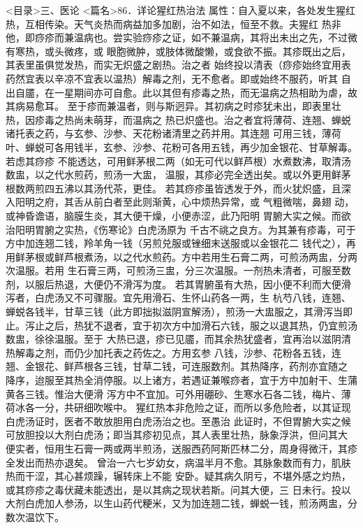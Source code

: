 \documentclass[a4paper,12pt,UTF8,twoside]{ctexbook}
\begin{document}
<目录>三、医论
<篇名>86．详论猩红热治法
属性：自入夏以来，各处发生猩红热，互相传染。天气炎热而病益加多加剧，治不如法，恒至不救。夫猩红 
热非他，即痧疹而兼温病也。尝实验痧疹之证，如不兼温病，其将出未出之先，不过微有寒热，或头微疼，或 
眼胞微肿，或肢体微酸懒，或食欲不振。其疹既出之后，其表里虽俱觉发热，而实无炽盛之剧热。治之者 
始终投以清表（痧疹始终宜用表药然宜表以辛凉不宜表以温热）解毒之剂，无不愈者。即或始终不服药，听其 
自出自靥，在一星期间亦可自愈。此以其但有疹毒之热，而无温病之热相助为虐，故其病易愈耳。 
至于疹而兼温者，则与斯迥异。其初病之时疹犹未出，即表里壮热，因疹毒之热尚未萌芽，而温病之 
热已炽盛也。治之者宜将薄荷、连翘、蝉蜕诸托表之药，与玄参、沙参、天花粉诸清里之药并用。其连翘 
可用三钱，薄荷叶、蝉蜕可各用钱半，玄参、沙参、花粉可各用五钱，再少加金银花、甘草解毒。若虑其痧疹 
不能透达，可用鲜茅根二两（如无可代以鲜芦根）水煮数沸，取清汤数盅，以之代水煎药，煎汤一大盅， 
温服，其疹必完全透出矣。或以外更用鲜茅根数两煎四五沸以其汤代茶，更佳。 
若其痧疹虽皆透发于外，而火犹炽盛，且深入阳明之府，其舌从前白者至此则渐黄，心中烦热异常，或 
气粗微喘，鼻翅 动，或神昏谵语，脑膜生炎，其大便干燥，小便赤涩，此乃阳明 
胃腑大实之候。而欲治阳明胃腑之实热，《伤寒论》白虎汤原为 
千古不祧之良方。为其兼有疹毒，可于方中加连翘二钱，羚羊角一钱（另煎兑服或锉细末送服或以金银花二 
钱代之），再用鲜茅根或鲜芦根煮汤，以之代水煎药。方中若用生石膏二两，可煎汤两盅，分两次温服。若用 
生石膏三两，可煎汤三盅，分三次温服。一剂热未清者，可服至数剂，以服后热退，大便仍不滑泻为度。 
若其胃腑虽有大热，因小便不利而大便滑泻者，白虎汤又不可骤服。宜先用滑石、生怀山药各一两，生 
杭芍八钱，连翘、蝉蜕各钱半，甘草三钱（此方即拙拟滋阴宣解汤），煎汤一大盅服之，其滑泻当即 
止。泻止之后，热犹不退者，宜于初次方中加滑石六钱，服之以退其热，仍宜煎汤数盅，徐徐温服。至于 
大热已退，疹已见靥，而其余热犹盛者，宜再治以滋阴清热解毒之剂，而仍少加托表之药佐之。方用玄参 
八钱，沙参、花粉各五钱，连翘、金银花、鲜芦根各三钱，甘草二钱，可连服数剂。其热降序，药剂亦宜随之 
降序，迨服至其热全消停服。以上诸方，若遇证兼喉痧者，宜于方中加射干、生蒲黄各三钱。惟治大便滑 
泻方中不宜加。可外用硼砂、生寒水石各二钱，梅片、薄荷冰各一分，共研细吹喉中。 
猩红热本非危险之证，而所以多危险者，以其证现白虎汤证时，医者不敢放胆用白虎汤治之也。至愚治 
此证时，不但胃腑大实之候可放胆投以大剂白虎汤；即当其疹初见点，其人表里壮热，脉象浮洪，但问其大 
便实者，恒用生石膏一两或两半煎汤，送服西药阿斯匹林二分，周身得微汗，其疹全发出而热亦退矣。 
曾治一六七岁幼女，病温半月不愈。其脉象数而有力，肌肤热而干涩，其心甚烦躁，辗转床上不能 
安卧。疑其病久阴亏，不堪外感之灼热，或其痧疹之毒伏藏未能透出，是以其病之现状若斯。问其大便，三 
日未行。投以大剂白虎加人参汤，以生山药代粳米，又为加连翘二钱，蝉蜕一钱，煎汤两盅，分数次温饮下。 
\end{document}
